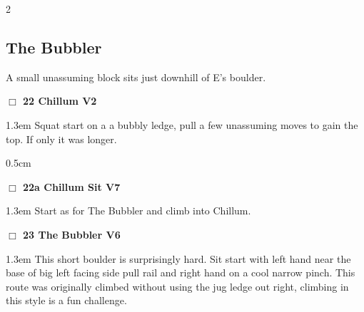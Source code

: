 \begin{multicols}{2}
\subsection*{The Bubbler}\label{bf:The Bubbler}
A small unassuming block sits just downhill of E's boulder.\\
\needspace{2em}
\label{rt:Chillum}
\colorbox{green!20}{
\parbox{0.95\linewidth}{
\hspace{-1ex}\textbf{$\Box$
22 Chillum V2  
}}}
\begin{adjustwidth}{1.3em}{}			
Squat start on a a bubbly ledge, pull a few unassuming moves to gain the top. If only it was longer.
\end{adjustwidth}
\begin{adjustwidth}{0.5cm}{}				
\needspace{4em}
\needspace{2em}
\label{vr:Chillum Sit}
\colorbox{Goldenrod!20}{
\parbox{0.95\linewidth}{
\hspace{-1ex}\textbf{$\Box$
22a Chillum Sit V7  
}}}
\begin{adjustwidth}{1.3em}{}			
Start as for The Bubbler and climb into Chillum.
\end{adjustwidth}
\end{adjustwidth}
\needspace{2em}
\label{rt:The Bubbler}
\colorbox{RoyalBlue!20}{
\parbox{0.95\linewidth}{
\hspace{-1ex}\textbf{$\Box$
23 The Bubbler V6  
}}}
\begin{adjustwidth}{1.3em}{}			
This short boulder is surprisingly hard. Sit start with left hand near the base of big left facing side pull rail and right hand on a cool narrow pinch. This route was originally climbed without using the jug ledge out right, climbing in this style is a fun challenge.
\end{adjustwidth}
	\end{multicols}
\newpage
